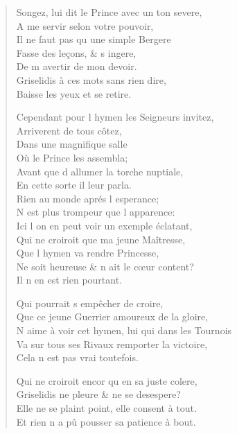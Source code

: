 \begin{verse}
Songez, lui dit le Prince avec un ton severe, \\
\vin A me servir selon votre pouvoir, \\
\vin Il ne faut pas qu\textquotesingle{} une simple Bergere \\
\vin Fasse des leçons, \& s\textquotesingle{} ingere, \\
\vin De m\textquotesingle{} avertir de mon devoir. \\
\vin Griselidis à ces mots sans rien dire, \\
\vin Baisse les yeux et se retire.

Cependant pour l\textquotesingle{} hymen les Seigneurs invitez, \\
\vin Arriverent de tous côtez, \\
\vin Dans une magnifique salle \\
\vin Où le Prince les assembla; \\
Avant que d\textquotesingle{} allumer la torche nuptiale, \\
\vin En cette sorte il leur parla. \\
\vin Rien au monde aprés l\textquotesingle{} esperance; \\
\vin N\textquotesingle{} est plus trompeur que l\textquotesingle{} apparence: \\
Ici l\textquotesingle{} on en peut voir un exemple éclatant, \\
\vin Qui ne croiroit que ma jeune Maîtresse, \\
\vin Que l\textquotesingle{} hymen va rendre Princesse, \\
Ne soit heureuse \& n\textquotesingle{} ait le cœur content? \\
\vin Il n\textquotesingle{} en est rien pourtant.

\vin Qui pourrait s\textquotesingle{} empêcher de croire, \\
Que ce jeune Guerrier amoureux de la gloire, \\
N\textquotesingle{} aime à voir cet hymen, lui qui dans les Tournois \\
Va sur tous ses Rivaux remporter la victoire, \\
\vin Cela n\textquotesingle{} est pas vrai toutefois.

Qui ne croiroit encor qu\textquotesingle{} en sa juste colere, \\
Griselidis ne pleure \& ne se desespere? \\
Elle ne se plaint point, elle consent à tout. \\
Et rien n\textquotesingle{} a pû pousser sa patience à bout.


\end{verse}
